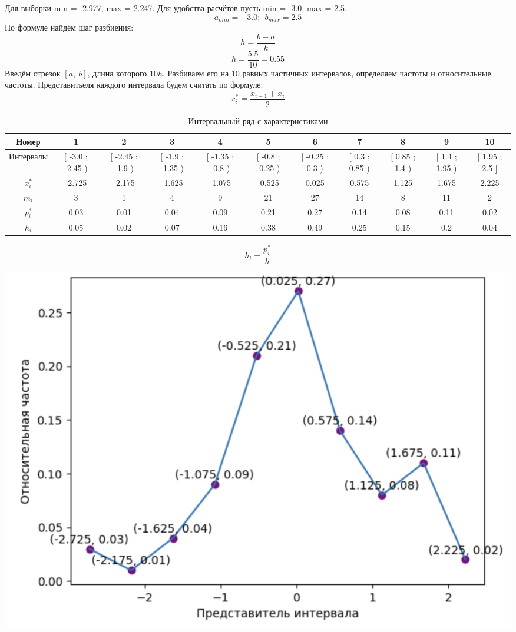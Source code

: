 \documentclass{article}
\begin{document}
Для выборки min = -2.977, max = 2.247. 
Для удобства расчётов пусть min = -3.0, max = 2.5.
\begin{equation*}
    a_{min} = -3.0;\ \  b_{max} = 2.5 
\end{equation*}
По формуле найдём шаг разбиения:
\begin{equation}
    h = \frac{b-a}{k}
\end{equation}
\begin{equation*}
    h = \frac{5.5}{10} = 0.55
\end{equation*}
Введём отрезок $[a,\ b]$, длина которого $10h$. Разбиваем его на 10 равных частичных интервалов, определяем частоты и относительные частоты. Представитьеля каждого интервала будем считать по формуле:
\begin{equation}
    x_i^* = \frac{x_{i-1}+x_i}{2}
\end{equation}

\begin{table}[h]
    \scriptsize
    \begin{tabular}{|*{11}{c|}}
        \hline
        Номер & 1  & 2  & 3  & 4  & 5  & 6  & 7  & 8  & 9  & 10 \\
        \hline
        Интервалы &\tiny[ -3.0 ; -2.45 )& \tiny[ -2.45 ; -1.9 ) & \tiny[ -1.9 ; -1.35 ) & \tiny[ -1.35 ; -0.8 ) & \tiny[ -0.8 ; -0.25 ) & \tiny[ -0.25 ; 0.3 ) & \tiny[ 0.3 ; 0.85 ) & \tiny[ 0.85 ; 1.4 ) & \tiny[ 1.4 ; 1.95 ) & \tiny[ 1.95 ; 2.5 ] \\
        \hline
        $x_i^*$& -2.725 &-2.175 &-1.625 &-1.075 &-0.525 &0.025 &0.575 &1.125 &1.675 &2.225\\
        \hline
        $m_i$& 3 &1 &4 &9 &21 &27 &14 &8 &11 &2\\
        \hline
        $p_i^*$& 0.03 &0.01 &0.04 &0.09 &0.21 &0.27 &0.14 &0.08 &0.11 &0.02\\
        \hline
        $h_i$& 0.05 &0.02 &0.07 &0.16 &0.38 &0.49 &0.25 &0.15 &0.2 &0.04\\
        \hline
    \end{tabular}
    \caption{Интервальный ряд с характеристиками}
\end{table}
\[h_i = \frac{p_i^*}{h}\]
\begin{center}
    \includegraphics[width=.7\textwidth]{poligon.png}
\end{center} 
\end{document}
